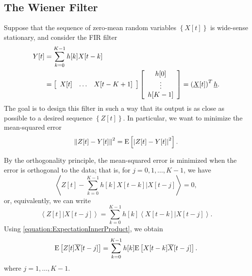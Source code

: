 \subsection{The Wiener Filter}

Suppose that the sequence of zero-mean random variables $\left\{ X[t] \right\}$ is wide-sense stationary, and consider the FIR filter
\begin{equation*}
\begin{split}
Y[t] &= \sum_{k=0}^{K-1} h[k] X[t - k] \\
&= \left[ \begin{array}{ccc} X[t] & \hdots & X[t-K+1] \end{array} \right]
\left[ \begin{array}{c} h[0] \\ \vdots \\ h[K-1] \end{array} \right]
= \left( \underline{X}[t] \right)^T \underline{h} .
\end{split}
\end{equation*}
The goal is to design this filter in such a way that its output is as close as possible to a desired sequence $\left\{ Z[t] \right\}$.
In particular, we want to minimize the mean-squared error
\begin{equation*}
\left\| Z[t] - Y[t] \right\|^2 = \mathrm{E} \left[ \left| Z[t] - Y[t] \right|^2 \right].
\end{equation*}

By the orthogonality principle, the mean-squared error is minimized when the error is orthogonal to the data; that is, for $j = 0, 1, \ldots, K-1$, we have
\begin{equation*}
\left\langle Z[t] - \sum_{k=0}^{K-1} h[k] X[t - k] \Big| X[t - j] \right\rangle = 0,
\end{equation*}
or, equivalently, we can write
\begin{equation*}
\left\langle Z[t] | X[t - j] \right\rangle
= \sum_{k=0}^{K-1} h[k] \left\langle X[t - k] | X[t - j] \right\rangle .
\end{equation*}
Using \eqref{equation:ExpectationInnerProduct}, we obtain
\begin{equation} \label{equation:WienerHopfConditions}
\mathrm{E} \left[ Z[t] \overline{X}[t - j] \right]
= \sum_{k=0}^{K-1} h[k] \mathrm{E} \left[ X[t - k] \overline{X}[t - j] \right] .
\end{equation}
where $j = 1, \ldots, K-1$.

